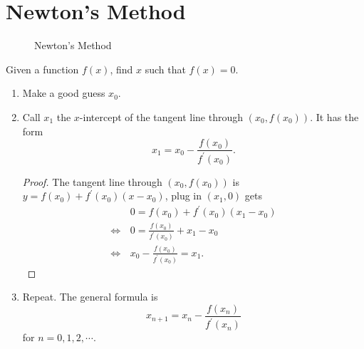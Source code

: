 \section{Newton's Method}
\begin{figure}[H]
    \centering
    \caption{Newton's Method}
\end{figure}
Given a function \(f(x)\), find \(x\) such that \(f(x)=0\).
\begin{enumerate}
    \item Make a good guess \(x_0\).
    \item Call \(x_1\) the \(x\)-intercept of the tangent line through \((x_0, f(x_0))\). It has the form
        \[
            \boxed{x_1=x_0-\frac{f(x_0)}{f^\prime (x_0)}.}
        \]
        \begin{proof}
            The tangent line through \((x_0, f(x_0))\) is \(y=f(x_0)+f^\prime (x_0)(x-x_0)\), plug in \((x_1, 0)\) gets
            \begin{align*}
                & 0=f(x_0)+f^\prime (x_0)(x_1-x_0)\\
                \Leftrightarrow\, & 0=\frac{f(x_0)}{f^\prime (x_0)}+x_1-x_0\\
                \Leftrightarrow\, & x_0-\frac{f(x_0)}{f^\prime (x_0)}=x_1.
            \end{align*}
        \end{proof}
    \item Repeat. The general formula is
        \[
            \boxed{x_{n+1}=x_n-\frac{f(x_n)}{f^\prime (x_n)}}
        \]
        for \(n=0,1,2,\cdots\).
\end{enumerate}
